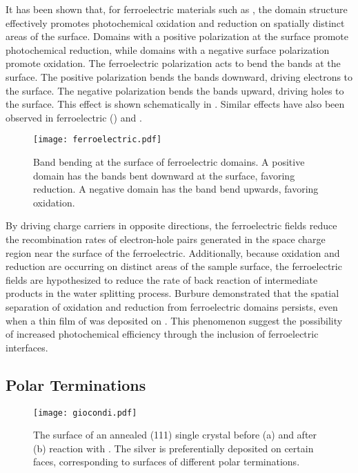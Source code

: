 It has been shown that, for ferroelectric materials such as , 
the domain structure effectively promotes photochemical oxidation and 
reduction on spatially distinct areas of the 
surface.\cite{Giocondi:2001gz,Burbure:2010go,Giocondi:2003ub,%
Giocondi:2001bi} Domains with a positive polarization at the surface 
promote photochemical reduction, while domains with a negative surface 
polarization promote oxidation. The ferroelectric polarization acts to bend 
the bands at the surface. The positive polarization bends the bands 
downward, driving electrons to the surface. The negative polarization bends 
the bands upward, driving holes to the surface. This effect is shown 
schematically in . Similar effects have also been 
observed in ferroelectric  () and 
.\cite{Hanson:2006bq,Kalinin:2002iw,Tiwari:2009jv}

\begin{figure}
	\centering
	\texttt{[image: ferroelectric.pdf]}
	\caption[Band bending at the surface of ferroelectric domains]{%
		Band bending at the surface of ferroelectric domains. A positive 
		domain has the bands bent downward at the surface, favoring 
		reduction. A negative domain has the band bend upwards, favoring 
		oxidation.}
	\label{fig:ferroelectric}
\end{figure}

By driving charge carriers in opposite directions, the ferroelectric fields 
reduce the recombination rates of electron-hole pairs generated in the 
space charge region near the surface of the ferroelectric. Additionally, 
because oxidation and reduction are occurring on distinct areas of the 
sample surface, the ferroelectric fields are hypothesized to reduce the 
rate of back reaction of intermediate products in the water splitting 
process. Burbure\cite{Burbure:2010go,Burbure:2006cq,Burbure:2010ti} 
demonstrated that the spatial separation of oxidation and reduction from 
ferroelectric domains persists, even when a thin film of  was 
deposited on . This phenomenon suggest the possibility of 
increased photochemical efficiency through the inclusion of ferroelectric 
interfaces.


\subsection{Polar Terminations}
\label{subsec:background.polarterms}


\begin{figure}
\begin{center}
\texttt{[image: giocondi.pdf]}
\caption[Surface of an annealed  (111) single crystal]{%
	The surface of an annealed  (111) single crystal before 
	(a) and after (b) reaction with . The silver is preferentially 
	deposited on certain faces, corresponding to surfaces of different 
	polar terminations.\cite{Giocondi:2003wc}}
\label{fig:giocondi}
\end{center}
\end{figure}

